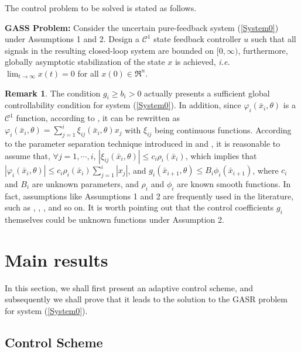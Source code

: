 \documentclass{tSYS2e}
\theoremstyle{plain}
\theoremstyle{definition}
\newtheorem{remark}{Remark}
\begin{document}
The control problem to be solved is stated as follows.

\textbf{GASS Problem:} Consider the
uncertain pure-feedback system (\ref{System0}) under Assumptions 1 and 2.
Design a $\mathcal{C}^{1}$ state feedback controller $u$ such that all signals in
the resulting closed-loop system are bounded on $[0,\infty )$, furthermore,
globally asymptotic stabilization of the state $x$ is achieved, \emph{i.e.} $
\lim_{t\rightarrow \infty }x(t)=0$ for all $x(0)\in \Re ^{n}$.

\begin{remark}
The condition $g_{i}\geq b_{i}>0$ actually presents a sufficient global
controllability condition for system (\ref{System0}).
In addition, since $\varphi _{i}(\bar{x}_{i},\theta )$ is a $\mathcal{C}^{1}$ function,
according to \cite{Nijmeijer1990}, it can be rewritten as $\varphi _{i}(\bar{
x}_{i},\theta )=\sum\nolimits_{j=1}^{i} \xi _{ij}(\bar{x}_{i},\theta )x_{j}$ with $
\xi _{ij}$ being continuous functions. According to the parameter separation
technique introduced in \cite{Lin2002a} and \cite{Lin2002b}, it is reasonable to assume that,
$\forall j=1,\cdots,i$, $\left|\xi_{ij}(\bar{x}_{i},\theta )\right| \leq c_{i}\rho _{i}(\bar{x}_{i})$, which implies that
$\left\vert\varphi _{i}( \bar{x}_{i},\theta )\right\vert\leq c_{i}\rho _{i}(\bar{x}
_{i})\sum\nolimits_{j=1}^{i}\left\vert x_{j}\right\vert$, and
$g_{i}(\bar{x}_{i+1},\theta)\leq B_{i}\phi _{i}(\bar{x}_{i+1})$, where $c_{i}$ and $B_{i}$
are unknown parameters, and $\rho _{i}$ and $\phi _{i}$
are known smooth functions. In fact, assumptions like Assumptions 1 and 2 are frequently
used in the literature, such as \cite{Lin2002a}, \cite{Lin2002b}, \cite{Sun2007}, and so on.
It is worth pointing out that the control coefficients $g_{i}$ themselves could be unknown functions under Assumption 2.
\end{remark}

\section{Main results}

In this section, we shall first present an adaptive control scheme, and
subsequently we shall prove that it leads to the solution to the GASR
problem for system (\ref{System0}).

\subsection{Control Scheme}
\end{document}

